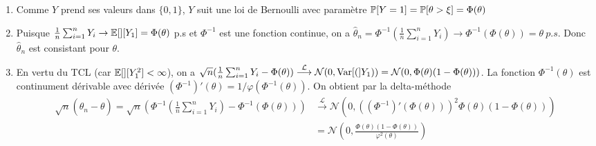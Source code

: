 \begin{solution}
  \begin{enumerate}
    \item
          Comme $Y$ prend ses valeurs dans $\{0,1\}$, $Y$ suit une loi de Bernoulli avec
          param\`etre $\mathbb{P}[Y=1] = \mathbb{P}[\theta>\xi] = \Phi(\theta)$

    \item
          Puisque $\frac1n\sum_{i=1}^n Y_i\to\mathbb{E}[][Y_1]=\Phi(\theta)$ p.s et $\Phi^{-1}$ est
          une fonction continue, on a $\hat \theta_n=\Phi^{-1}(\frac1n\sum_{i=1}^n Y_i)\to
            \Phi^{-1}(\Phi(\theta))=\theta~p.s$. Donc $\hat\theta_n$ est consistant pour
          $\theta$.

    \item
          En vertu du TCL (car $\mathbb{E}[][Y^2_1]<\infty$), on a $\sqrt
            n(\frac1n\sum_{i=1}^n Y_i-\Phi(\theta))\stackrel{\mathcal
              L}\longrightarrow\mathcal N(0,\operatorname{Var}[(]Y_1))=\mathcal
            N(0,\Phi(\theta)(1-\Phi(\theta)))$. La fonction $\Phi^{-1}(\theta)$ est
          continument d\'erivable avec d\'eriv\'ee $(\Phi^{-1})'(\theta) =
            1/\varphi(\Phi^{-1}(\theta))$. On obtient par la delta-m\'ethode
          \begin{align*}
            \sqrt n(\hat\theta_n-\theta) =\sqrt n\left(\Phi^{-1}\left(\frac1n\sum_{i=1}^n Y_i\right)-\Phi^{-1}(\Phi(\theta))\right)
             & \stackrel{\mathcal L}\longrightarrow \mathcal N(0, {((\Phi^{-1})'(\Phi(\theta)))}^2   \Phi(\theta)(1-\Phi(\theta))) \\
             & =\mathcal N\left(0, \frac{  \Phi(\theta)(1-\Phi(\theta))}{ \varphi^2(\theta)}\right)
          \end{align*}

  \end{enumerate}

\end{solution}